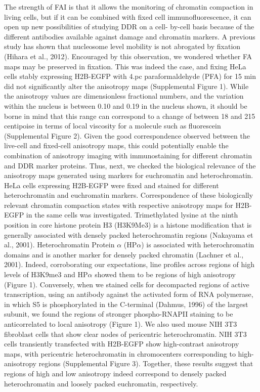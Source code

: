 The strength of FAI is that it allows the monitoring of chromatin compaction in living cells, but if it can be combined with fixed cell immunofluorescence, it can open up new possibilities of studying DDR on a cell- by-cell basis because of the different antibodies available against damage and chromatin markers. A previous study has shown that nucleosome level mobility is not abrogated by fixation (Hihara et al., 2012). Encouraged by this observation, we wondered whether FA maps may be preserved in fixation. This was indeed the case, and fixing HeLa cells stably expressing H2B-EGFP with 4.pc paraformaldehyde (PFA) for 15 min did not significantly alter the anisotropy maps (Supplemental Figure 1). While the anisotropy values are dimensionless fractional numbers, and the variation within the nucleus is between 0.10 and 0.19 in the nucleus shown, it should be borne in mind that this range can correspond to a change of between 18 and 215 centipoise in terms of local viscosity for a molecule such as fluorescein (Supplemental Figure 2). Given the good correspondence observed between the live-cell and fixed-cell anisotropy maps, this could potentially enable the combination of anisotropy imaging with immunostaining for different chromatin and DDR marker proteins. Thus, next, we checked the biological relevance of the anisotropy maps generated using markers for euchromatin and heterochromatin. HeLa cells expressing H2B-EGFP were fixed and stained for different heterochromatin and euchromatin markers. Correspondence of these biologically relevant chromatin compaction states with respective anisotropy maps for H2B-EGFP in the same cells was investigated. Trimethylated lysine at the ninth position in core histone protein H3 (H3K9Me3) is a histone modification that is generally associated with densely packed heterochromatin regions (Nakayama et al., 2001). Heterochromatin Protein $\alpha$ (HP$\alpha$) is associated with heterochromatin domains and is another marker for densely packed chromatin (Lachner et al., 2001). Indeed, corroborating our expectations, line profiles across regions of high levels of H3K9me3 and HP$\alpha$ showed them to be regions of high anisotropy (Figure 1). Conversely, when we stained cells for decompacted regions of active transcription, using an antibody against the activated form of RNA polymerase, in which S5 is phosphorylated in the C-terminal (Dahmus, 1996) of the largest subunit, we found the regions of stronger phospho-RNAPII staining to be anticorrelated to local anisotropy (Figure 1). We also used mouse NIH 3T3 fibroblast cells that show clear nodes of pericentric heterochromatin. NIH 3T3 cells transiently transfected with H2B-EGFP show high-contrast anisotropy maps, with pericentric heterochromatin in chromocenters corresponding to high-anisotropy regions (Supplemental Figure 3). Together, these results suggest that regions of high and low anisotropy indeed correspond to densely packed heterochromatin and loosely packed euchromatin, respectively.


